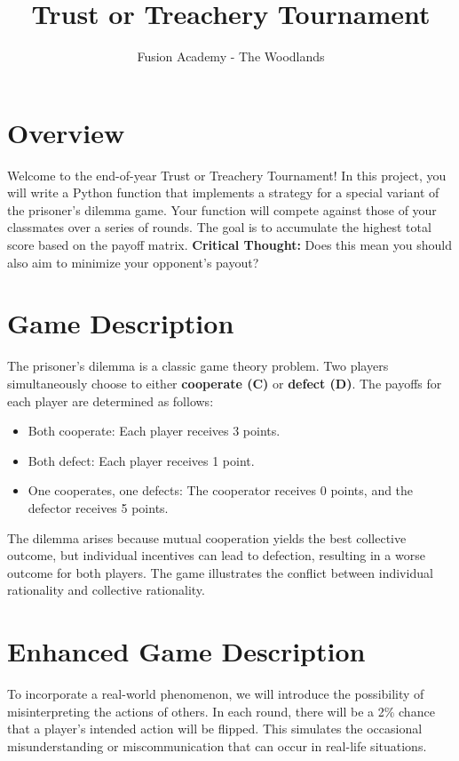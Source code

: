\documentclass[11pt]{article}
\title{Trust or Treachery Tournament}
\author{Fusion Academy - The Woodlands}
\date{}
\begin{document}
\maketitle

\section*{Overview}
Welcome to the end-of-year Trust or Treachery Tournament! In this project, you will write a Python function that implements a strategy for a special variant of the prisoner's dilemma game. Your function will compete against those of your classmates over a series of rounds. The goal is to accumulate the highest total score based on the payoff matrix. \textbf{Critical Thought: }Does this mean you should also aim to minimize your opponent's payout?

\section*{Game Description}
The prisoner's dilemma is a classic game theory problem. Two players simultaneously choose to either \textbf{cooperate (C)} or \textbf{defect (D)}. The payoffs for each player are determined as follows:
\begin{itemize}
    \item Both cooperate: Each player receives 3 points.
    \item Both defect: Each player receives 1 point.
    \item One cooperates, one defects: The cooperator receives 0 points, and the defector receives 5 points.
\end{itemize}

The dilemma arises because mutual cooperation yields the best collective outcome, but individual incentives can lead to defection, resulting in a worse outcome for both players. The game illustrates the conflict between individual rationality and collective rationality.

\section*{Enhanced Game Description}
To incorporate a real-world phenomenon, we will introduce the possibility of misinterpreting the actions of others. In each round, there will be a 2\% chance that a player's intended action will be flipped. This simulates the occasional misunderstanding or miscommunication that can occur in real-life situations.
\end{document}
